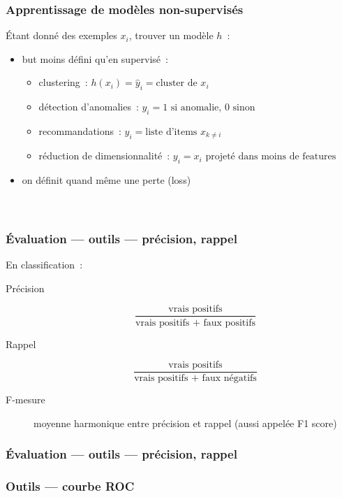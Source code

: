 \documentclass{formation}
\begin{document}
\begin{frame}
  \frametitle{Apprentissage de modèles non-supervisés}
  Étant donné des exemples $x_i$, trouver un modèle $h$ :
  \begin{itemize}[<+->]
  \item but moins défini qu'en supervisé :
    \begin{itemize}[<+->]
    \item clustering : $h(x_i) = \hat{y}_i = \text{cluster de }x_i$
    \item détection d'anomalies : $y_i = 1 \text{ si anomalie, }0
      \text{ sinon}$
    \item recommandations : $y_i = \text{liste d'items }x_{k\neq i}$
    \item réduction de dimensionnalité : $y_i = x_i \text{ projeté dans
      moins de features}$
    \end{itemize}
  \item on définit quand même une perte (loss) \\[.2cm]
    \\[.2cm]
    \\[.2cm]
  \end{itemize}
\end{frame}

\begin{frame}
  \frametitle{Évaluation — outils — précision, rappel}
  En classification :
  \begin{description}
  \item[Précision]
    \[
    \frac{\text{vrais positifs}}{\text{vrais positifs + faux positifs}}
    \]
  \item[Rappel]
    \[
    \frac{\text{vrais positifs}}{\text{vrais positifs + faux négatifs}}
  \]
  \item[F-mesure] moyenne harmonique entre précision et rappel (aussi
    appelée F1 score)
  \end{description}
\end{frame}

\begin{frame}
  \frametitle{Évaluation — outils — précision, rappel}
\end{frame}

\begin{frame}
  \frametitle{Outils — courbe ROC}
\end{frame}
\end{document}
